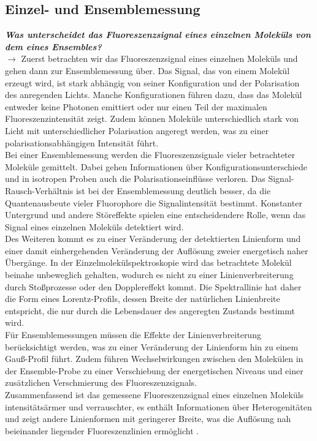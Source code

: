 \subsection{\label{subsec:FZV4}Einzel- und Ensemblemessung}
\textbf{\textit{Was unterscheidet das Fluoreszenzsignal eines einzelnen Moleküls von dem eines Ensembles?}} \\
$\rightarrow$
Zuerst betrachten wir das Fluoreszenzsignal eines einzelnen Moleküls und gehen dann zur Ensemblemessung über. 
Das Signal, das von einem Molekül erzeugt wird, ist stark abhängig von seiner Konfiguration und der Polarisation 
des anregenden Lichts. Manche Konfigurationen führen dazu, dass das Molekül entweder keine Photonen emittiert 
oder nur einen Teil der maximalen Fluoreszenzintensität zeigt. Zudem können Moleküle unterschiedlich stark von 
Licht mit unterschiedlicher Polarisation angeregt werden, was zu einer polarisationsabhängigen Intensität führt. \\
Bei einer Ensemblemessung werden die Fluoreszenzsignale vieler betrachteter Moleküle gemittelt. Dabei gehen 
Informationen über Konfigurationsunterschiede und in isotropen Proben auch die Polarisationseinflüsse verloren. 
Das Signal-Rausch-Verhältnis ist bei der Ensemblemessung deutlich besser, da die Quantenausbeute vieler Fluorophore 
die Signalintensität bestimmt. Konstanter Untergrund und andere Störeffekte spielen eine entscheidendere Rolle, 
wenn das Signal eines einzelnen Moleküls detektiert wird. \\
Des Weiteren kommt es zu einer Veränderung der detektierten Linienform und einer damit einhergehenden Veränderung 
der Auflösung zweier energetisch naher Übergänge. In der Einzelmolekülspektroskopie wird das betrachtete Molekül 
beinahe unbeweglich gehalten, wodurch es nicht zu einer Linienverbreiterung durch Stoßprozesse oder den Dopplereffekt 
kommt. Die Spektrallinie hat daher die Form eines Lorentz-Profils, dessen Breite der natürlichen Linienbreite entspricht, 
die nur durch die Lebensdauer des angeregten Zustands bestimmt wird. \\
Für Ensemblemessungen müssen die Effekte der Linienverbreiterung berücksichtigt werden, was zu einer Veränderung der 
Linienform hin zu einem Gauß-Profil führt. Zudem führen Wechselwirkungen zwischen den Molekülen in der Ensemble-Probe 
zu einer Verschiebung der energetischen Niveaus und einer zusätzlichen Verschmierung des Fluoreszenzsignals. \\
Zusammenfassend ist das gemessene Fluoreszenzsignal eines einzelnen Moleküls intensitätsärmer und verrauschter, es enthält 
Informationen über Heterogenitäten und zeigt andere Linienformen mit geringerer Breite, was die Auflösung nah beieinander 
liegender Fluoreszenzlinien ermöglicht \cite{P1, P2, Demtroder, SingEns}. \\
